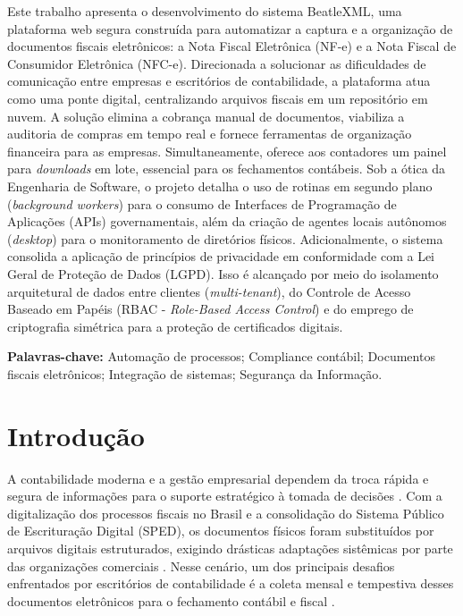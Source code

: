 \documentclass[12pt]{article}
\begin{document}
\begin{resumo} 
Este trabalho apresenta o desenvolvimento do sistema BeatleXML, uma plataforma web segura construída para automatizar a captura e a organização de documentos fiscais eletrônicos: a Nota Fiscal Eletrônica (NF-e) e a Nota Fiscal de Consumidor Eletrônica (NFC-e). Direcionada a solucionar as dificuldades de comunicação entre empresas e escritórios de contabilidade, a plataforma atua como uma ponte digital, centralizando arquivos fiscais em um repositório em nuvem. A solução elimina a cobrança manual de documentos, viabiliza a auditoria de compras em tempo real e fornece ferramentas de organização financeira para as empresas. Simultaneamente, oferece aos contadores um painel para \textit{downloads} em lote, essencial para os fechamentos contábeis. Sob a ótica da Engenharia de Software, o projeto detalha o uso de rotinas em segundo plano (\textit{background workers}) para o consumo de Interfaces de Programação de Aplicações (APIs) governamentais, além da criação de agentes locais autônomos (\textit{desktop}) para o monitoramento de diretórios físicos. Adicionalmente, o sistema consolida a aplicação de princípios de privacidade em conformidade com a Lei Geral de Proteção de Dados (LGPD). Isso é alcançado por meio do isolamento arquitetural de dados entre clientes (\textit{multi-tenant}), do Controle de Acesso Baseado em Papéis (RBAC - \textit{Role-Based Access Control}) e do emprego de criptografia simétrica para a proteção de certificados digitais.

\textbf{Palavras-chave:} Automação de processos; Compliance contábil; Documentos fiscais eletrônicos; Integração de sistemas; Segurança da Informação.
\end{resumo}


\section{Introdução}

A contabilidade moderna e a gestão empresarial dependem da troca rápida e segura de informações para o suporte estratégico à tomada de decisões \cite{laudon2014}. Com a digitalização dos processos fiscais no Brasil e a consolidação do Sistema Público de Escrituração Digital (SPED), os documentos físicos foram substituídos por arquivos digitais estruturados, exigindo drásticas adaptações sistêmicas por parte das organizações comerciais \cite{marion2020}. Nesse cenário, um dos principais desafios enfrentados por escritórios de contabilidade é a coleta mensal e tempestiva desses documentos eletrônicos para o fechamento contábil e fiscal \cite{castro2025}.
\end{document}
